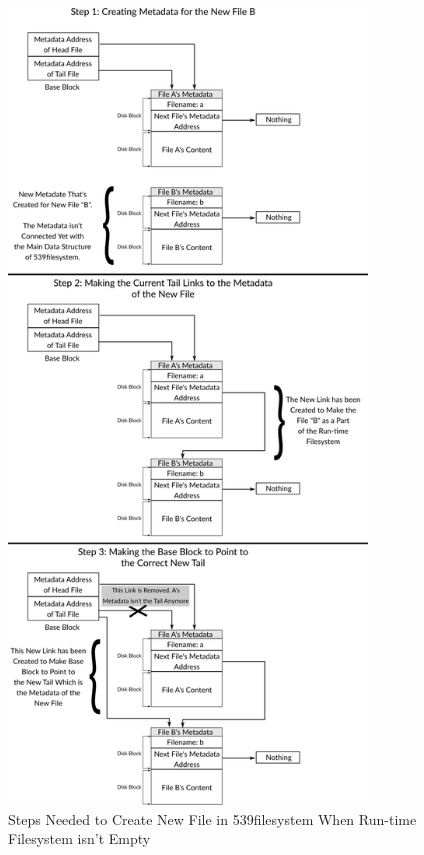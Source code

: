 \begin{figure}
\centering
\includegraphics[width=0.85000\textwidth]{Figures/filesystem-ch/create_file_not_empty_case.png}
\caption{Steps Needed to Create New File in 539filesystem When Run-time
Filesystem isn't Empty}\label{fig:create_file_not_empty_case}
\end{figure}

